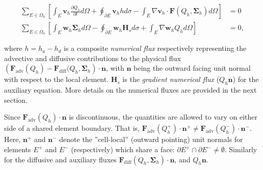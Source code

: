 \documentclass[11pt]{article}
\begin{document}
\begin{align}
\sum_{E\in\Omega_h} \left\lbrack \int_E \mathbf{v}_h\frac{\partial Q_h}
{\partial t} d\Omega + \oint_{\partial E} \mathbf{v}_h h d\sigma - \int_E \nabla
\mathbf{v}_h\cdot\mathbf{F}(Q_h, \mathbf{\Sigma}_h)d\Omega\right\rbrack &= 0 \\
\sum_{E\in\Omega_h}\left\lbrack \int_E \mathbf{w}_h\mathbf{\Sigma}_h d\Omega -
\oint_{\partial E} \mathbf{w}_h\mathbf{H}_s d\sigma + \int_E \nabla\mathbf{w}_h Q_h d\Omega\right\rbrack &= 0,
\end{align}

where $h = h_a - h_d$ is a composite \textit{numerical flux} respectively representing the advective and diffusive contributions to the physical flux $\left(\mathbf{F}_\text{adv}(Q_h) - \mathbf{F}_\text{diff}(Q_h, \mathbf{\Sigma}_h\right)\cdot\mathbf{n}$, with $\mathbf{n}$ being the outward facing unit normal with respect to the local element. $\mathbf{H}_s$ is the \textit{gradient numerical flux} ($Q_h\mathbf{n}$) for the auxiliary equation. More details on the numerical fluxes are provided in the next section.

Since $\mathbf{F}_\text{adv}(Q_h)\cdot\mathbf{n}$ is discontinuous, the quantities are allowed to vary on either side of a shared element boundary. That is, $\mathbf{F}_\text{adv}(Q^+_h)\cdot\mathbf{n}^+ \neq \mathbf{F}_\text{adv}(Q^-_h)\cdot\mathbf{n}^-$. Here, $\mathbf{n}^+$ and $\mathbf{n}^-$ denote the ''cell-local'' (outward pointing) unit normals for elements $E^+$ and $E^-$ (respectively) which share a face: $\partial E^+ \cap \partial E^- \neq \emptyset$. Similarly for the diffusive and auxiliary fluxes $\mathbf{F}_\text{diff}(Q_h, \mathbf{\Sigma}_h)\cdot\mathbf{n}$, and $Q_h\mathbf{n}$.
\end{document}
